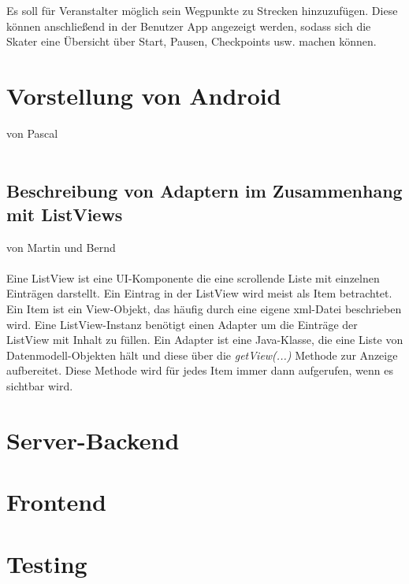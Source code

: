 \documentclass[a4paper, titlepage]{scrartcl}
\newcommand{\AUTHOR}[1]{
	von #1 \\ \\
}
\newcommand{\METHODE}[1]{
	\emph{#1}
}
\begin{document}
Es soll für Veranstalter möglich sein Wegpunkte zu Strecken hinzuzufügen. Diese können anschließend in der Benutzer App angezeigt werden, sodass sich die Skater eine Übersicht über Start, Pausen, Checkpoints usw. machen können.


\section{Vorstellung von Android}
\AUTHOR{Pascal}

\subsection{Beschreibung von Adaptern im Zusammenhang mit ListViews}
\label{sec:adapter}
\AUTHOR{Martin und Bernd}
Eine ListView ist eine UI-Komponente die eine scrollende Liste mit einzelnen Einträgen darstellt. Ein Eintrag in der ListView wird meist als Item betrachtet. Ein Item ist ein View-Objekt, das häufig durch eine eigene xml-Datei beschrieben wird. Eine ListView-Instanz benötigt einen Adapter um die Einträge der ListView mit Inhalt zu füllen. Ein Adapter ist eine Java-Klasse, die eine Liste von Datenmodell-Objekten hält und diese über die \METHODE{getView(...)} Methode zur Anzeige aufbereitet. Diese Methode wird für jedes Item immer dann aufgerufen, wenn es sichtbar wird.

\section{Server-Backend}


\section{Frontend}


\section{Testing}

\end{document}
